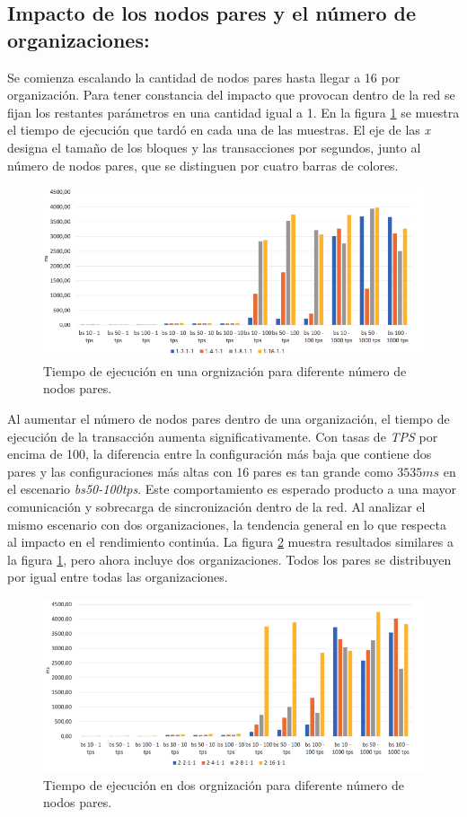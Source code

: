 \subsection*{Impacto de los nodos pares y el n\'umero de organizaciones:}

Se comienza escalando la cantidad de nodos pares hasta llegar a 16 por organizaci\'on. Para tener constancia del impacto que provocan dentro de la red se fijan los restantes par\'ametros en una cantidad igual a 1. En la figura \ref{EscalaParesUnaOrganizacion} se muestra el tiempo de ejecuci\'on que tard\'o en cada una de las muestras. El eje de las \emph{x} designa el tama\~no de los bloques y las transacciones por segundos, junto al n\'umero de nodos pares, que se distinguen por cuatro barras de colores.\\ 

\begin{figure}[h]
\centering
\includegraphics[width=0.6\linewidth]{Graphics/EscalaParesUnaOrganizacion.png}
\caption{Tiempo de ejecuci\'on en una orgnizaci\'on para diferente n\'umero de nodos pares.}
\label{EscalaParesUnaOrganizacion}
\end{figure}

Al aumentar el n\'umero de nodos pares dentro de una organizaci\'on, el tiempo de ejecuci\'on de la transacci\'on aumenta significativamente. Con tasas de \emph{TPS} por encima de 100, la diferencia entre la configuraci\'on m\'as baja que contiene dos pares y las configuraciones m\'as altas con 16 pares es tan grande como $3535ms$ en el escenario \emph{bs50-100tps}. Este comportamiento es esperado producto a una mayor comunicaci\'on y sobrecarga de sincronizaci\'on dentro de la red. Al analizar el mismo escenario con dos organizaciones, la tendencia general en lo que respecta al impacto en el rendimiento contin\'ua. La figura \ref{EscalaParesDosOrganizaciones} muestra resultados similares a la figura \ref{EscalaParesUnaOrganizacion}, pero ahora incluye dos organizaciones. Todos los pares se distribuyen por igual entre todas las organizaciones.\\

\begin{figure}[h]
\centering
\includegraphics[width=0.6\linewidth]{Graphics/EscalaParesDosOrganizaciones.png}
\caption{Tiempo de ejecuci\'on en dos orgnizaci\'on para diferente n\'umero de nodos pares.}
\label{EscalaParesDosOrganizaciones}
\end{figure}

